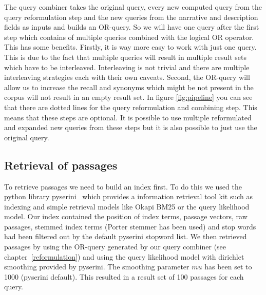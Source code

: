         The query combiner takes the original query, every new computed query from the query reformulation step and the new queries from the narrative and description fields as inputs and builds an OR-query. So we will have one query after the first step which contains of multiple queries combined with the logical OR operator. This has some benefits. Firstly, it is way more easy to work with just one query. This is due to the fact that multiple queries will result in multiple result sets which have to be interleaved. Interleaving is not trivial and there are multiple interleaving strategies each with their own caveats. Second, the OR-query will allow us to increase the recall and synonyms which might be not present in the corpus will not result in an empty result set. In figure \ref{fig:pipeline} you can see that there are dotted lines for the query reformulation and combining step. This means that these steps are optional. It is possible to use multiple reformulated and expanded new queries from these steps but it is also possible to just use the original query.
    \subsection{Retrieval of passages} \label{retrieval}
        To retrieve passages we need to build an index first. To do this we used the python library pyserini~\cite{LinMLYPN2021} which provides a information retrieval tool kit such as indexing and simple retrieval models like Okapi BM25 or the query likelihood model. Our index contained the position of index terms, passage vectors, raw passages, stemmed index terms (Porter stemmer has been used) and stop words had been filtered out by the default pyserini stopword list. We then retrieved passages by using the OR-query generated by our query combiner (see chapter~\ref{reformulation}) and using the query likelihood model with dirichlet smoothing provided by pyserini. The smoothing parameter $mu$ has been set to 1000 (pyserini default). This resulted in a result set of 100 passages for each query.
